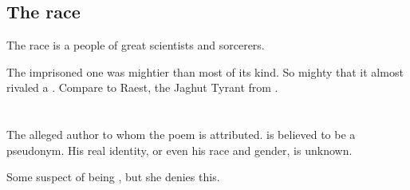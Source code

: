 \subsection{The \Haskelek{} race}
The \Haskelek{} race is a people of great scientists and sorcerers. 


The imprisoned one was mightier than most of its kind. 
So mighty that it almost rivaled a \dragonlord. 
Compare to Raest, the Jaghut Tyrant from \cite{StevenErikson:GardensoftheMoon}. 



















\section[Melcryth]{\Melcryth}
The alleged author to whom the poem \emph{} is attributed. 
\quo{\Melcryth} is believed to be a pseudonym. 
His real identity, or even his race and gender, is unknown. 

Some suspect  of being \Melcryth, but she denies this. 































